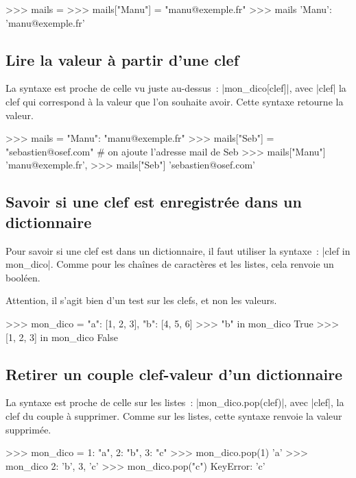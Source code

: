 		\begin{pythoncode}
			>>> mails = {}
			>>> mails["Manu"] = "manu@exemple.fr"
			>>> mails
			{'Manu': 'manu@exemple.fr'}
		\end{pythoncode}
	
	\subsection{Lire la valeur à partir d'une clef}
		
		La syntaxe est proche de celle vu juste au-dessus~: \python|mon_dico[clef]|, avec \python|clef| la clef qui correspond à la valeur que l'on souhaite avoir. Cette syntaxe retourne la valeur.
		
		\begin{pythoncode}
			>>> mails = {"Manu": "manu@exemple.fr"}
			>>> mails["Seb"] = "sebastien@osef.com" # on ajoute l'adresse mail de Seb
			>>> mails["Manu"]
			'manu@exemple.fr',
			>>> mails["Seb"]
			'sebastien@osef.com'
		\end{pythoncode}
	
	\subsection{Savoir si une clef est enregistrée dans un dictionnaire}
		
		Pour savoir si une clef est dans un dictionnaire, il faut utiliser la syntaxe~: \python|clef in mon_dico|. Comme pour les chaînes de caractères et les listes, cela renvoie un booléen.
		
		Attention, il s'agit bien d'un test sur les clefs, et non les valeurs.
		
		\begin{pythoncode}
			>>> mon_dico = {"a": [1, 2, 3], "b": [4, 5, 6]}
			>>> "b" in mon_dico
			True
			>>> [1, 2, 3] in mon_dico
			False
		\end{pythoncode}
	
	\subsection{Retirer un couple clef-valeur d'un dictionnaire}
		
		La syntaxe est proche de celle sur les listes~: \python|mon_dico.pop(clef)|, avec \python|clef|, la clef du couple à supprimer.
		Comme sur les listes, cette syntaxe renvoie la valeur supprimée.
		
		\begin{pythoncode}
			>>> mon_dico = {1: "a", 2: "b", 3: "c"}
			>>> mon_dico.pop(1)
			'a'
			>>> mon_dico
			{2: 'b', 3, 'c'}
			>>> mon_dico.pop("c")
			KeyError: 'c'
		\end{pythoncode}

			
		
		
			
			
		
		
		
		
		


